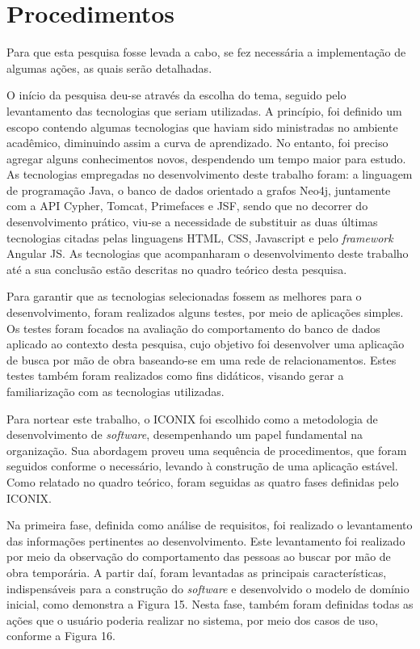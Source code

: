 \section{Procedimentos}

\par Para que esta pesquisa fosse levada a cabo, se fez necessária a implementação de algumas ações, as quais serão detalhadas.

\par O início da pesquisa deu-se através da escolha do tema, seguido pelo levantamento das tecnologias que seriam utilizadas. A princípio, foi definido um escopo contendo algumas tecnologias que haviam sido ministradas no ambiente acadêmico, diminuindo assim a curva de aprendizado. No entanto, foi preciso agregar alguns conhecimentos novos, despendendo um tempo maior para estudo. As tecnologias empregadas no desenvolvimento deste trabalho foram: a linguagem de programação Java, o banco de dados orientado a grafos Neo4j, juntamente com a API Cypher, Tomcat, Primefaces e JSF, sendo que no decorrer do desenvolvimento prático, viu-se a necessidade de substituir as duas últimas tecnologias citadas pelas linguagens HTML, CSS, Javascript e pelo \textit{framework} Angular JS. As tecnologias que acompanharam o desenvolvimento deste trabalho até a sua conclusão estão descritas no quadro teórico desta pesquisa.

\par Para garantir que as tecnologias selecionadas fossem as melhores para o desenvolvimento, foram realizados alguns testes, por meio de aplicações simples. Os testes foram focados na avaliação do comportamento do banco de dados aplicado ao contexto desta pesquisa, cujo objetivo foi desenvolver uma aplicação de busca por mão de obra baseando-se em uma rede de relacionamentos. Estes testes também foram realizados como fins didáticos, visando gerar a familiarização com as tecnologias utilizadas.

\par Para nortear este trabalho, o ICONIX foi escolhido como a metodologia de desenvolvimento de \textit{software}, desempenhando um papel fundamental na organização. Sua abordagem proveu uma sequência de procedimentos, que foram seguidos conforme o necessário, levando à construção de uma aplicação estável. Como relatado no quadro teórico, foram seguidas as quatro fases definidas pelo ICONIX.

\par Na primeira fase, definida como análise de requisitos, foi realizado o levantamento das informações pertinentes ao desenvolvimento. Este levantamento foi realizado por meio da observação do comportamento das pessoas ao buscar por mão de obra temporária. A partir daí, foram levantadas as principais características, indispensáveis para a construção do \textit{software} e desenvolvido o modelo de domínio inicial, como demonstra a Figura 15. Nesta fase, também foram definidas todas as ações que o usuário poderia realizar no sistema, por meio dos casos de uso, conforme a Figura 16.

